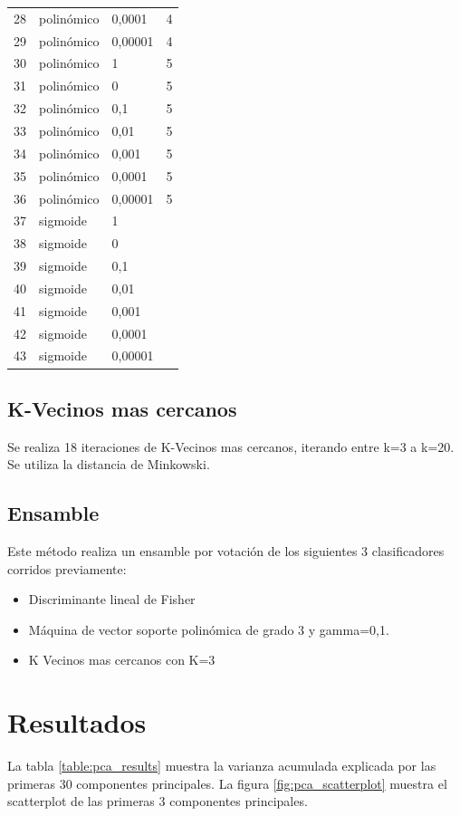 \documentclass[journal]{IEEEtran}
\begin{document}
\begin{table}[ht!]
\begin{tabular}{l | l l l }
28 & polinómico & 0,0001  & 4 \\ 
29 & polinómico & 0,00001  & 4 \\ 
30 & polinómico & 1  & 5 \\ 
31 & polinómico & 0  & 5 \\ 
32 & polinómico & 0,1  & 5 \\ 
33 & polinómico & 0,01  & 5 \\ 
34 & polinómico & 0,001  & 5 \\ 
35 & polinómico & 0,0001  & 5 \\ 
36 & polinómico & 0,00001  & 5 \\ 
37 & sigmoide & 1 &  \\ 
38 & sigmoide & 0 &  \\ 
39 & sigmoide & 0,1 &  \\ 
40 & sigmoide & 0,01 &  \\ 
41 & sigmoide & 0,001 &  \\ 
42 & sigmoide & 0,0001 &  \\ 
43 & sigmoide & 0,00001 &  \\ 
\end{tabular}
\end{table}

\subsection{K-Vecinos mas cercanos}
Se realiza 18 iteraciones de K-Vecinos mas cercanos, iterando entre k=3
a k=20. Se utiliza la distancia de Minkowski.

\subsection{Ensamble}
Este método realiza un ensamble por votación de los siguientes 3
clasificadores corridos previamente:

\begin{itemize}
\item Discriminante lineal de Fisher
\item Máquina de vector soporte polinómica de grado 3 y gamma=0,1. 
\item K Vecinos mas cercanos con K=3
\end{itemize}

\section{Resultados}

La tabla \ref{table:pca_results} muestra la varianza acumulada explicada 
por las primeras 30 componentes principales. La figura \ref{fig:pca_scatterplot}
muestra el scatterplot de las primeras 3 componentes principales.
\end{document}
